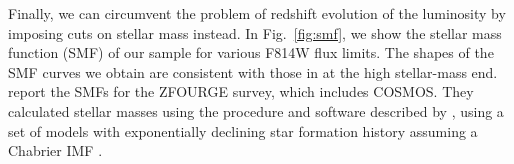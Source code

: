 \documentclass[twocolumn,useAMS,usenatbib]{mn2e}
\newcommand{\rachel}[1]{{\textcolor{red}{#1}}}
\newcommand{\arun}[1]{{\textcolor{blue}{#1}}}
\newcommand{\claire}[1]{{\textcolor{magenta}{#1}}}
\begin{document}
Finally, we can circumvent the problem of redshift evolution of the
luminosity by imposing cuts on stellar mass instead. In Fig.~\ref{fig:smf}, we show the stellar mass function (SMF) of our sample for various F814W flux limits.
The shapes of the SMF curves we obtain are consistent with those in \cite{Tomczak_SMF} at the high stellar-mass end.
\cite{Tomczak_SMF} report the SMFs for the ZFOURGE survey, which
includes COSMOS. They calculated stellar masses using the procedure
and software described by \cite{2009ApJ...700..221K}, using a set of models
with exponentially declining star formation history \citep{2003MNRAS.344.1000B} assuming a
Chabrier IMF \citep{ChabrierIMF}. 
\end{document}
